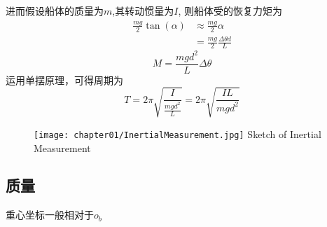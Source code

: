 进而假设船体的质量为$m$,其转动惯量为$I$, 则船体受的恢复力矩为
\begin{equation}
  \begin{aligned}
    \frac{mg}{2} \tan(\alpha)   &\approx   \frac{mg}{2} \alpha \\
    &=\frac{mg}{2}\frac{\Delta \theta d}{L}
  \end{aligned}
\end{equation}
\begin{equation}
  M=\frac{mgd^2 }{L} \Delta \theta
\end{equation}
运用单摆原理，可得周期为
\begin{equation}
  T=2 \pi \sqrt{\frac{I}{\frac{mgd^2 }{L} }} = 2 \pi \sqrt{\frac{I L}{mgd^2}}
\end{equation}


\begin{figure}[!htp]
  \centering
  \texttt{[image: chapter01/InertialMeasurement.jpg]}
    {Sketch of Inertial Measurement}
  \label{fig:InertialMeasurement}
\end{figure}


\subsection{质量}
重心坐标一般相对于$o_b$
